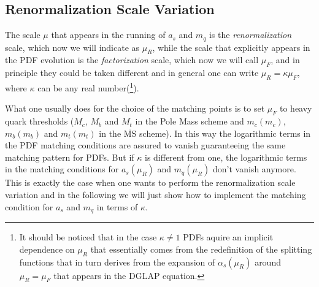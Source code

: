 \documentclass[10pt,a4paper]{article}
\begin{document}
\subsection{Renormalization Scale Variation}

The scale $\mu$ that appears in the running of $a_s$ and $m_q$ is the
\textit{renormalization} scale, which now we will indicate as $\mu_R$,
while the scale that explicitly appears in the PDF evolution is the
\textit{factorization} scale, which now we will call $\mu_F$, and in
principle they could be taken different and in general one can write
$\mu_R = \kappa \mu_F$, where $\kappa$ can be any real
number(\footnote{It should be noticed that in the case $\kappa\neq1$
PDFs aquire an implicit dependence on $\mu_R$ that essentially comes
from the redefinition of the splitting functions that in turn derives
from the expansion of $\alpha_s(\mu_R)$ around $\mu_R=\mu_F$ that
appears in the DGLAP equation.}).

What one usually does for the choice of the matching points is to set
$\mu_F$ to heavy quark thresholds ($M_c$, $M_b$ and $M_t$ in the Pole
Mass scheme and $m_c(m_c)$, $m_b(m_b)$ and $m_t(m_t)$ in the
$\overline{\mbox{MS}}$ scheme). In this way the logarithmic terms in
the PDF matching conditions are assured to vanish guaranteeing the
same matching pattern for PDFs. But if $\kappa$ is different from one,
the logarithmic terms in the matching conditions for $a_s(\mu_R)$ and
$m_q(\mu_R)$ don't vanish anymore. This is exactly the case when one
wants to perform the renormalization scale variation and in the
following we will just show how to implement the matching condition
for $a_s$ and $m_q$ in terms of $\kappa$.
\end{document}
